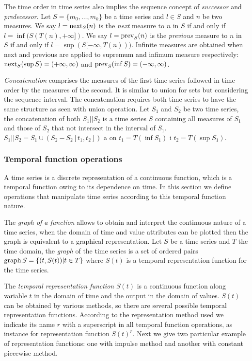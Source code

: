 The time order in time series also implies the sequence concept of
\emph{successor} and \emph{predecessor}.  Let $S=\{m_0, \ldots, m_k\}$
be a time series and $l\in S$ and $n$ be two measures. We say
$l=\operatorname*{next}_S(n)$ is the \emph{next} measure to $n$ in $S$ if and only if
$l=\inf(S(T(n),+\infty])$.  We say $l=\operatorname*{prev}_S(n)$ is the
\emph{previous} measure to $n$ in $S$ if and only if
$l=\sup(S[-\infty,T(n)))$. %
Infinite measures are obtained when next and previous are applied to
supremum and infimum measure respectively: $\operatorname*{next}_S(\sup
S)=(+\infty,\infty)$ and $\operatorname*{prev}_S(\inf S)=(-\infty,\infty)$.



\emph{Concatenation} comprises the measures of the first time series followed
in time order by the measures of the second. It is similar to union
for sets but considering the sequence interval. The concatenation
requires both time series to have the same structure as seen with
union operation.  Let $S_1$ and $S_2$ be two time series, the
concatenation of both $S_1 || S_2$ is a time series $S$ containing all
measures of $S_1$ and those of $S_2$ that not intersect in the
interval of $S_1$.  $S_1 || S_2 = S_1 \cup ( S_2 - S_2[t_1,t_2] )$ a
on $t_1=T(\inf S_1)$ i $t_2=T(\sup S_1)$.




\subsubsection{Temporal function operations}


A time series is a discrete representation of a continuous function,
which is a temporal function owing to its dependence on time. In this
section we define operations that manipulate time series according to
this temporal function nature.

The \emph{graph of a function} allows to obtain and interpret the
continuous nature of a time series, when the domain of time and value
attributes can be plotted then the graph is equivalent to a graphical
representation.  Let $S$ be a time series and $T$ the time domain, the
\emph{graph} of the time series is a set of ordered pairs $\operatorname*{graph} S =
\{ (t,S(t)) | t\in T \}$ where $S(t)$ is a temporal representation
function for the time series.

The \emph{temporal representation function} $S(t)$ is a continuous
function along variable $t$ in the domain of time and the output in
the domain of values. $S(t)$ can be obtained by various methods, so
there are several possible temporal representation
functions. According to the representation method used we indicate its
name $r$ with a superscript in all temporal function operations, as
instance for representation function $S(t)^r$. Next we give two
particular example of representation functions: one with impulse
method and another with constant piecewise method.



